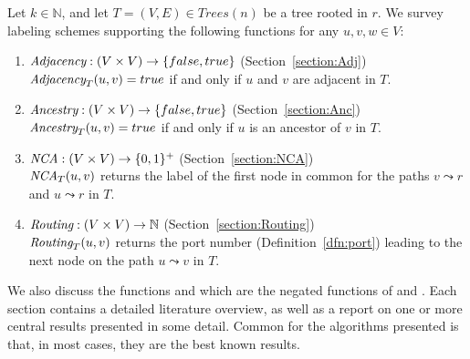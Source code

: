 Let $k \in \mathbb{N}$, and let $T=(V,E)  \in Trees(n)$ be a tree rooted in $r$.
We survey labeling  schemes supporting  the following functions for any  $u,v,w \in V$:
	\begin{enumerate}
	  \setlength{\itemsep}{2pt}
	\item $\emph{Adjacency}:(V \times V) \rightarrow \{false,true\}$ (Section~\ref{section:Adj})  			 \\ $\emph{Adjacency}_T(u,v) = true$ if and only if $u$ and $v$ are adjacent in $T$.
	\item $\emph{Ancestry}: (V \times V) \rightarrow \{false,true\}$    (Section~\ref{section:Anc})  		  \\ $\emph{Ancestry}_T(u,v) = true$ if and only if $u$ is an ancestor of $v$ in $T$.
	\item $\emph{NCA}: (V \times V) \rightarrow \{ 0,1 \}^+$       (Section~\ref{section:NCA})  			\\  $\emph{NCA}_T(u,v)$ returns the label of the first node in common for the paths  $v \leadsto r $ and $u \leadsto r$ in $T$. 
	\item $\emph{Routing}: (V \times V) \rightarrow  \mathbb{N} $        (Section~\ref{section:Routing})  					\\  $\emph{Routing}_T(u,v)$ returns the port number (Definition~\ref{dfn:port}) leading to the next node on the  path  $u \leadsto v$ in $T$.
	\end{enumerate}
We also discuss the functions \nonadjacency and \nonancestry which are the negated functions of \adjacency and \ancestry. Each section contains a detailed literature overview,  as well as a report on one or more central results presented in some detail. Common for the algorithms presented is that, in most cases, they are  the best known results.

